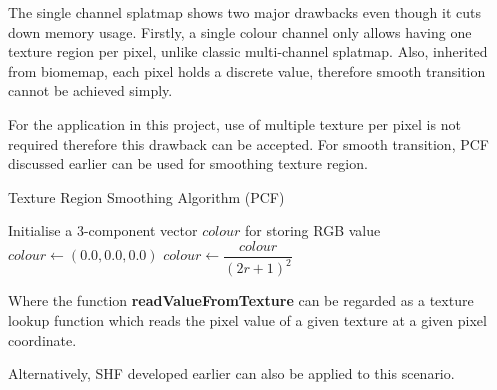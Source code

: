 \documentclass[oneside, a4paper]{report}
\begin{document}
    The single channel splatmap shows two major drawbacks even though it cuts down memory usage. Firstly, a single colour channel only allows having one texture region per pixel, unlike classic multi-channel splatmap. Also, inherited from biomemap, each pixel holds a discrete value, therefore smooth transition cannot be achieved simply.
    
    For the application in this project, use of multiple texture per pixel is not required therefore this drawback can be accepted. For smooth transition, PCF discussed earlier can be used for smoothing texture region.

    \begin{algorithm}[H]
        \caption{Texture Region Smoothing Algorithm (PCF)}


        Initialise a 3-component vector \(colour\) for storing RGB value\;
        \(colour \leftarrow (0.0, 0.0, 0.0)\)\;
        \(colour \leftarrow \dfrac{colour}{(2r + 1)^{2}}\)\;

    \end{algorithm}

    Where the function \textbf{readValueFromTexture} can be regarded as a texture lookup function which reads the pixel value of a given texture at a given pixel coordinate.
    
    Alternatively, SHF developed earlier can also be applied to this scenario.
\end{document}
